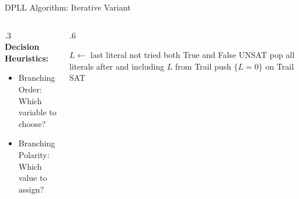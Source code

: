 \documentclass[t]{sdqbeamer2}
\begin{document}
\begin{frame}{DPLL Algorithm: Iterative Variant}\begin{block}{}
\begin{columns}[T]
\begin{column}{.3\linewidth}
~\\[1em]
\textbf{Decision Heuristics:}~\\[1em]
\begin{itemize}\setlength{\itemsep}{1em}
	\item Branching Order:\\[1ex] Which variable to choose?
	\item Branching Polarity:\\[1ex] Which value to assign?
\end{itemize}
\end{column}
\begin{column}{.6\linewidth}
\begin{algorithm}[H]
\DontPrintSemicolon
\caption{iterativeDPLL(CNF Formula $F$)}
\BlankLine

 {
	 {
		$L \leftarrow$ last literal not tried both True and False\;
		 {\Return UNSAT}
		pop all literals after and including $L$ from Trail\;
		push $\{ L = 0 \}$ on Trail\;
	}
}
\Return SAT\;
\end{algorithm}
\end{column}
\end{columns}
\end{block}
\end{frame}
\end{document}
